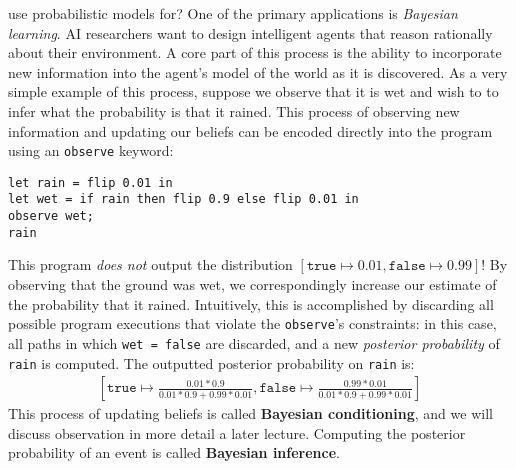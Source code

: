 \documentclass{tufte-handout}
\newcommand{\defn}[1]{\textbf{#1}}
\newcommand{\true}[0]{\texttt{true}}
\newcommand{\false}[0]{\texttt{false}}
\begin{document}
 use probabilistic models for? One of the 
primary applications is \emph{Bayesian learning}. AI researchers want to 
design intelligent agents that reason rationally about their environment. A 
core part of this process is the ability to incorporate new information into 
the agent's model of the world as it is discovered. As a very simple example of 
this process, suppose we observe that it is wet and wish to to infer 
what the probability is that it rained. This process of observing new information 
and updating our beliefs can be encoded directly into the program using 
an \texttt{observe} keyword:

\begin{lstlisting}
let rain = flip 0.01 in
let wet = if rain then flip 0.9 else flip 0.01 in
observe wet;
rain
\end{lstlisting}

This program \emph{does not} output the distribution $[\true \mapsto 0.01, \false \mapsto 0.99]$!
By observing that the ground was wet, we correspondingly increase our 
estimate of the probability that it rained. Intuitively, this is accomplished 
by discarding all possible program executions that violate the \texttt{observe}'s 
constraints: in this case, all paths in which \texttt{wet = \false} are discarded, and 
a new \emph{posterior probability} of \texttt{rain} is computed. The outputted posterior 
probability on \texttt{rain} is:
\begin{align*}
  \left[\true \mapsto \frac{0.01 * 0.9}{0.01 * 0.9 + 0.99 * 0.01}, \false \mapsto \frac{0.99 * 0.01}{0.01 * 0.9 + 0.99 * 0.01} \right]
\end{align*}
This process of updating beliefs is called \defn{Bayesian conditioning}, 
and we will discuss observation in more detail a later lecture.
Computing the posterior probability of an event is called \defn{Bayesian inference}.
\end{document}
